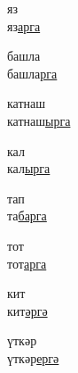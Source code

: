 \begin{multicols}{4}
\begin{enumerate}
\begin{minipage}{\linewidth}
    \item
    яз\\
    яз\underline{ар}\underline{га}\\
\end{minipage}

\begin{minipage}{\linewidth}
    \item
    башла\\
    башла\underline{р}\underline{га}\\
\end{minipage}

\begin{minipage}{\linewidth}
    \item
    катнаш\\
    катнаш\underline{ыр}\underline{га}\\
\end{minipage}

\begin{minipage}{\linewidth}
    \item
    кал\\
    кал\underline{ыр}\underline{га}\\
\end{minipage}

\begin{minipage}{\linewidth}
    \item
    тап\\
    та\underline{бар}\underline{га}\\
\end{minipage}

\begin{minipage}{\linewidth}
    \item
    тот\\
    тот\underline{ар}\underline{га}\\
\end{minipage}

\begin{minipage}{\linewidth}
    \item
    кит\\
    кит\underline{әр}\underline{гә}\\
\end{minipage}

\begin{minipage}{\linewidth}
    \item
    үткәр\\
    үткәр\underline{ер}\underline{гә}\\
\end{minipage}


\end{enumerate}
\end{multicols}
